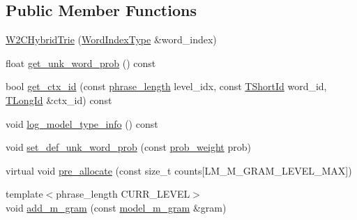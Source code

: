 \subsection*{Public Member Functions}
\begin{DoxyCompactItemize}
\item 
\hyperlink{classuva_1_1smt_1_1bpbd_1_1server_1_1lm_1_1_w2_c_hybrid_trie_a0e0d25fc61bb6a560ae0eff5e0b833c5}{W2\+C\+Hybrid\+Trie} (\hyperlink{classuva_1_1smt_1_1bpbd_1_1server_1_1lm_1_1_word_index_trie_base_a77ee32bf3a9f8a89558bda4f2031200c}{Word\+Index\+Type} \&word\+\_\+index)
\item 
float \hyperlink{classuva_1_1smt_1_1bpbd_1_1server_1_1lm_1_1_w2_c_hybrid_trie_af4da6f4e6bea572dc5e0ed6b8a0ebfb1}{get\+\_\+unk\+\_\+word\+\_\+prob} () const 
\item 
bool \hyperlink{classuva_1_1smt_1_1bpbd_1_1server_1_1lm_1_1_w2_c_hybrid_trie_a81d4d527eb43c342f11ab8889b4be6e8}{get\+\_\+ctx\+\_\+id} (const \hyperlink{namespaceuva_1_1smt_1_1bpbd_1_1server_af068a19c2e03116caf3e3827a3e40e35}{phrase\+\_\+length} level\+\_\+idx, const \hyperlink{namespaceuva_1_1smt_1_1bpbd_1_1server_1_1lm_1_1identifiers_a33043a191e9a637dea742a89d23c8bdc}{T\+Short\+Id} word\+\_\+id, \hyperlink{namespaceuva_1_1smt_1_1bpbd_1_1server_1_1lm_1_1identifiers_a6841847096e455ad3c38689bc548b3b0}{T\+Long\+Id} \&ctx\+\_\+id) const 
\item 
void \hyperlink{classuva_1_1smt_1_1bpbd_1_1server_1_1lm_1_1_w2_c_hybrid_trie_abfe352e0e22a1c37f35a31983006f5ab}{log\+\_\+model\+\_\+type\+\_\+info} () const 
\item 
void \hyperlink{classuva_1_1smt_1_1bpbd_1_1server_1_1lm_1_1_w2_c_hybrid_trie_abae7a889f13aca6fbed98a94df02f8c1}{set\+\_\+def\+\_\+unk\+\_\+word\+\_\+prob} (const \hyperlink{namespaceuva_1_1smt_1_1bpbd_1_1server_a01e9ea4de9c226f4464862e84ff0bbcc}{prob\+\_\+weight} prob)
\item 
virtual void \hyperlink{classuva_1_1smt_1_1bpbd_1_1server_1_1lm_1_1_w2_c_hybrid_trie_ac7fda8008b7fbbe321b131f95c53c64b}{pre\+\_\+allocate} (const size\+\_\+t counts\mbox{[}L\+M\+\_\+\+M\+\_\+\+G\+R\+A\+M\+\_\+\+L\+E\+V\+E\+L\+\_\+\+M\+A\+X\mbox{]})
\item 
{\footnotesize template$<$phrase\+\_\+length C\+U\+R\+R\+\_\+\+L\+E\+V\+E\+L$>$ }\\void \hyperlink{classuva_1_1smt_1_1bpbd_1_1server_1_1lm_1_1_w2_c_hybrid_trie_adf3c3bf873528fb2fcea7a114dd63fd7}{add\+\_\+m\+\_\+gram} (const \hyperlink{classuva_1_1smt_1_1bpbd_1_1server_1_1lm_1_1m__grams_1_1model__m__gram}{model\+\_\+m\+\_\+gram} \&gram)

\end{DoxyCompactItemize}
